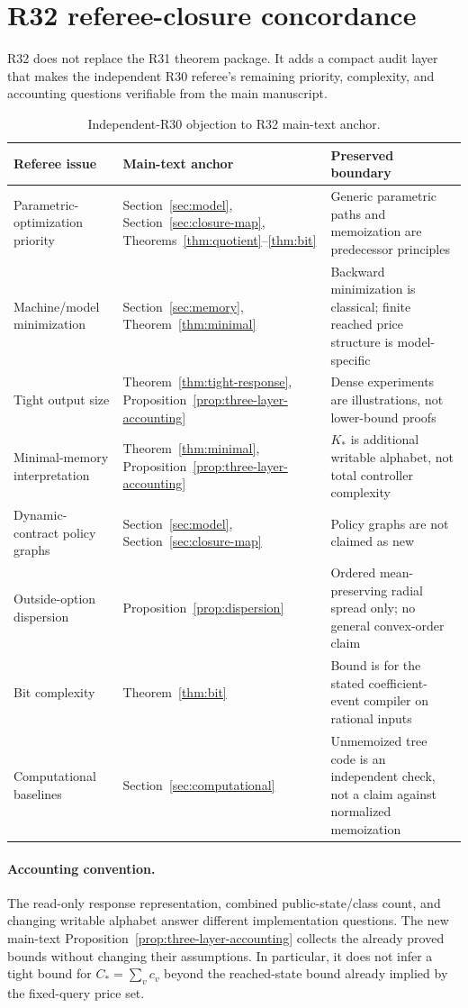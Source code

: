 \section{R32 referee-closure concordance}\label{ec:r32-closure}
R32 does not replace the R31 theorem package. It adds a compact audit layer that makes the independent R30 referee's remaining priority, complexity, and accounting questions verifiable from the main manuscript.

\begin{table}[h]
\caption{Independent-R30 objection to R32 main-text anchor.}\label{tab:ec-r32-concordance}
\small
\begin{tabular}{p{}p{}p{}}
\toprule
Referee issue & Main-text anchor & Preserved boundary \\
\midrule
Parametric-optimization priority & Section~\ref{sec:model}, Section~\ref{sec:closure-map}, Theorems~\ref{thm:quotient}--\ref{thm:bit} & Generic parametric paths and memoization are predecessor principles \\
Machine/model minimization & Section~\ref{sec:memory}, Theorem~\ref{thm:minimal} & Backward minimization is classical; finite reached price structure is model-specific \\
Tight output size & Theorem~\ref{thm:tight-response}, Proposition~\ref{prop:three-layer-accounting} & Dense experiments are illustrations, not lower-bound proofs \\
Minimal-memory interpretation & Theorem~\ref{thm:minimal}, Proposition~\ref{prop:three-layer-accounting} & $K_*$ is additional writable alphabet, not total controller complexity \\
Dynamic-contract policy graphs & Section~\ref{sec:model}, Section~\ref{sec:closure-map} & Policy graphs are not claimed as new \\
Outside-option dispersion & Proposition~\ref{prop:dispersion} & Ordered mean-preserving radial spread only; no general convex-order claim \\
Bit complexity & Theorem~\ref{thm:bit} & Bound is for the stated coefficient-event compiler on rational inputs \\
Computational baselines & Section~\ref{sec:computational} & Unmemoized tree code is an independent check, not a claim against normalized memoization \\
\bottomrule
\end{tabular}
\end{table}

\paragraph{Accounting convention.}
The read-only response representation, combined public-state/class count, and changing writable alphabet answer different implementation questions. The new main-text Proposition~\ref{prop:three-layer-accounting} collects the already proved bounds without changing their assumptions. In particular, it does not infer a tight bound for $C_*=\sum_v c_v$ beyond the reached-state bound already implied by the fixed-query price set.

